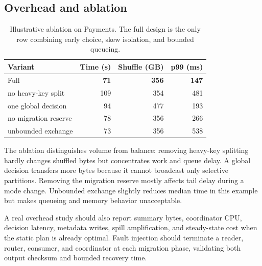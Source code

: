 \subsection{Overhead and ablation}

\begin{table}[t]
  \caption{Illustrative ablation on Payments.  The full design is the only row
  combining early choice, skew isolation, and bounded queueing.}
  \label{tab:ablation}
  \centering
  \small
  \begin{tabular}{@{}lrrr@{}}
    \toprule
    Variant & Time (s) & Shuffle (GB) & p99 (ms) \\
    \midrule
    Full \system{}           & \textbf{71} & \textbf{356} & \textbf{147} \\
    no heavy-key split       & 109 & 354 & 481 \\
    one global decision      &  94 & 477 & 193 \\
    no migration reserve     &  78 & 356 & 266 \\
    unbounded exchange       &  73 & 356 & 538 \\
    \bottomrule
  \end{tabular}
\end{table}

The ablation distinguishes volume from balance: removing heavy-key splitting
hardly changes shuffled bytes but concentrates work and queue delay.  A global
decision transfers more bytes because it cannot broadcast only selective
partitions.  Removing the migration reserve mostly affects tail delay during a
mode change.  Unbounded exchange slightly reduces median time in this example
but makes queueing and memory behavior unacceptable.

A real overhead study should also report summary bytes, coordinator CPU,
decision latency, metadata writes, spill amplification, and steady-state cost
when the static plan is already optimal.  Fault injection should terminate a
reader, router, consumer, and coordinator at each migration phase, validating
both output checksum and bounded recovery time.
